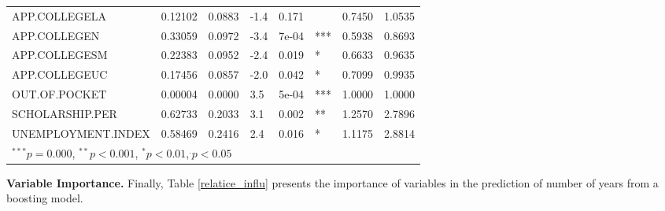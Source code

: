 \documentclass[12pt,english]{report}
\begin{document}
\begin{table}[H]
\begin{adjustbox}{width=0.95\textwidth}
\begin{tabular}{|llllllll|}
APP.COLLEGELA                  &  0.12102 & 0.0883 &  -1.4  &  0.171 &    &0.7450 & 1.0535 \\
APP.COLLEGEN                   &  0.33059 & 0.0972 &  -3.4  &  7e-04 & ***&0.5938 & 0.8693 \\
APP.COLLEGESM                  &  0.22383 & 0.0952 &  -2.4  &  0.019 & *  &0.6633 & 0.9635 \\
APP.COLLEGEUC                  &  0.17456 & 0.0857 &  -2.0  &  0.042 & *  &0.7099 & 0.9935 \\
OUT.OF.POCKET                  &  0.00004 & 0.0000 &   3.5  &  5e-04 & ***&1.0000 & 1.0000 \\
SCHOLARSHIP.PER                &  0.62733 & 0.2033 &   3.1  &  0.002 & ** &1.2570 & 2.7896 \\
UNEMPLOYMENT.INDEX             &  0.58469 & 0.2416 &   2.4  &  0.016 & *  &1.1175 & 2.8814 \\
\hline %
\multicolumn{7}{l}{\scriptsize{$^{***} p=0.000$, $^{**} p<0.001$, $^*p<0.01$,$^{.}p<0.05$}}

\end{tabular}
\end{adjustbox}
\end{table}
 

 
 
 
 
 
 
 
 
 
 
 
 
 
 
 
 
 
 
 
 
 
 





\vspace{0.15in}
\noindent \textbf{Variable Importance.} Finally, Table \ref{relatice_influ} presents the importance of variables in the prediction of number of years from a boosting model. %
\end{document}

